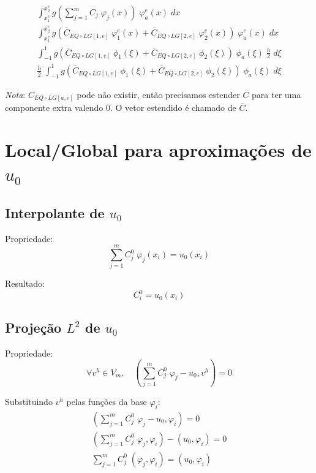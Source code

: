 \documentclass[a4paper]{article}
\newcommand{\vphi}{\varphi}
\begin{document}
\[ \begin{array}{l} \displaystyle
    \int_{x^e_1}^{x^e_2}{
        g\left(\sum_{j=1}^m{ C_j \; \vphi_j(x) }\right) \; \vphi^e_a(x)
    \;dx}
    \\[2ex] \displaystyle
    \int_{x^e_1}^{x^e_2}{
        g\left(
            \bar{C}_{EQ{\circ}LG[1, e]} \; \vphi^e_1(x)
            + \bar{C}_{EQ{\circ}LG[2, e]} \; \vphi^e_2(x)
        \right) \; \vphi^e_a(x)
    \;dx}
    \\[2ex] \displaystyle
    \int_{-1}^1{
        g(
            \bar{C}_{EQ{\circ}LG[1, e]} \; \phi_1(\xi)
            + \bar{C}_{EQ{\circ}LG[2, e]} \; \phi_2(\xi)
        ) \; \phi_a(\xi)
        \; \frac{h}{2}
    \;d\xi}
    \\[2ex] \displaystyle
    \frac{h}{2} \; \int_{-1}^1{
        g(
            \bar{C}_{EQ{\circ}LG[1, e]} \; \phi_1(\xi)
            + \bar{C}_{EQ{\circ}LG[2, e]} \; \phi_2(\xi)
        ) \; \phi_a(\xi)
    \;d\xi}
\end{array} \]

\emph{Nota}: \(C_{EQ{\circ}LG[a, e]}\) pode não existir,
então precisamos estender \(C\)
para ter uma componente extra valendo \(0\).
O vetor estendido é chamado de \(\bar{C}\).

\section{Local/Global para aproximações de \texorpdfstring{\(u_0\)}{u0}}
\label{sec:U0}

\subsection{Interpolante de \texorpdfstring{\(u_0\)}{u0}}

Propriedade:
\[
    \sum_{j=1}^m{ C^0_j \; \vphi_j(x_i) } = u_0(x_i)
\]

Resultado:
\[
    C^0_i = u_0(x_i)
\]

\subsection{Projeção \texorpdfstring{\(L^2\)}{L2} de \texorpdfstring{\(u_0\)}{u0}}

Propriedade:
\[
    \forall v^h \in V_m, \quad
    (\sum_{j=1}^m{ C^0_j \; \vphi_j } - u_0, v^h) = 0
\]

Substituindo \(v^h\) pelas funções da base \(\vphi_i\):
\[ \begin{array}{l} \displaystyle
    (\sum_{j=1}^m{ C^0_j \; \vphi_j } - u_0, \vphi_i) = 0
    \\ \displaystyle
    (\sum_{j=1}^m{ C^0_j \; \vphi_j }, \vphi_i) - (u_0, \vphi_i) = 0
    \\ \displaystyle
    \sum_{j=1}^m{ C^0_j \; (\vphi_j, \vphi_i) } = (u_0, \vphi_i)
\end{array} \]
\end{document}
